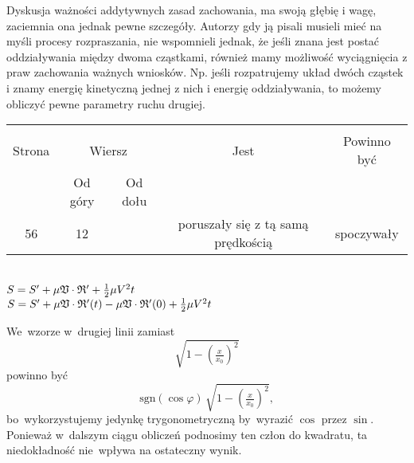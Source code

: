 \documentclass[a4paper,11pt]{article}
\begin{document}
\vspace{\spaceFour}


\start {} Dyskusja ważności addytywnych zasad zachowania, ma
swoją głębię i wagę, zaciemnia ona jednak pewne szczegóły. Autorzy gdy
ją pisali musieli mieć na myśli procesy rozpraszania, nie wspomnieli
jednak, że jeśli znana jest postać oddziaływania między dwoma
cząstkami, również mamy możliwość wyciągnięcia z praw zachowania
ważnych wniosków. Np. jeśli rozpatrujemy układ dwóch cząstek i znamy
energię kinetyczną jednej z nich i energię oddziaływania, to możemy
obliczyć pewne parametry ruchu drugiej.


\begin{center}
  \begin{tabular}{|c|c|c|c|c|}
    \hline
    & \multicolumn{2}{c|}{} & & \\
    Strona & \multicolumn{2}{c|}{Wiersz} & Jest
                              & Powinno być \\ \cline{2-3}
    & Od góry & Od dołu & & \\
    \hline
    56  & 12 & & poruszały się z tą samą prędkością & spoczywały \\
    \hline
  \end{tabular}
\end{center}
\noi
{} \\
\Jest $S = S' + \mu \mathfrak{V} \cdot \mathfrak{R}' + \frac{ 1 }{ 2 } \mu V^{ 2 } t$ \\
\Pow $S = S' + \mu \mathfrak{V} \cdot \mathfrak{R}'( t ) - \mu \mathfrak{V} \cdot
\mathfrak{R}'( 0 ) + \frac{ 1 }{ 2 } \mu V^{ 2 } t$ \\

\vspace{\spaceTwo}








\start {} We~wzorze w~drugiej linii zamiast
\begin{equation}
  \sqrt{1 - \left( \tfrac{ x }{ x_{ 0 } } \right)^{ 2 } }
\end{equation}
powinno być
\begin{equation}
  \mathrm{sgn}( \cos \varphi ) \, \sqrt{1 - \left( \tfrac{ x }{ x_{ 0 } }
    \right)^{ 2 } },
\end{equation}
bo~wykorzystujemy jedynkę trygonometryczną by~wyrazić $\cos$ przez
$\sin$. Ponieważ w~dalszym ciągu obliczeń podnosimy ten człon do
kwadratu, ta niedokładność nie~wpływa na ostateczny wynik.
\end{document}
